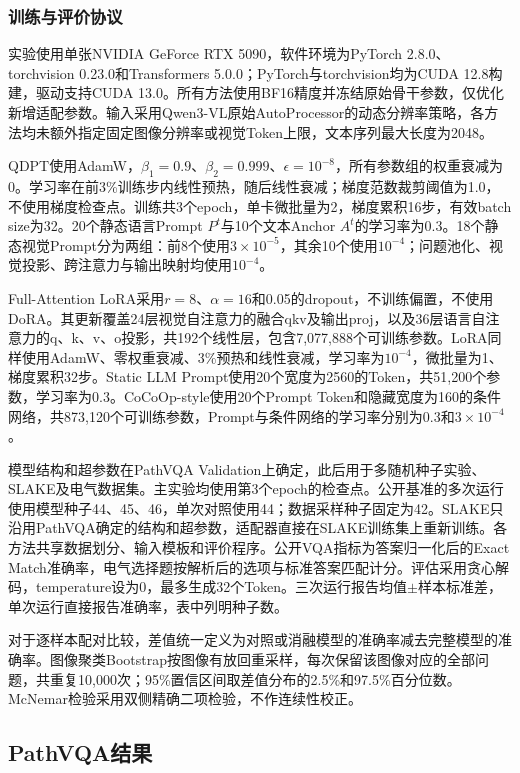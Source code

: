 \documentclass[pdflatex,sn-mathphys-num]{sn-jnl}
\begin{document}
\subsubsection{训练与评价协议}

实验使用单张NVIDIA GeForce RTX 5090，软件环境为PyTorch 2.8.0、torchvision 0.23.0和Transformers 5.0.0；PyTorch与torchvision均为CUDA 12.8构建，驱动支持CUDA 13.0。所有方法使用BF16精度并冻结原始骨干参数，仅优化新增适配参数。输入采用Qwen3-VL原始AutoProcessor的动态分辨率策略，各方法均未额外指定固定图像分辨率或视觉Token上限，文本序列最大长度为2048。

QDPT使用AdamW，$\beta_1=0.9$、$\beta_2=0.999$、$\epsilon=10^{-8}$，所有参数组的权重衰减为0。学习率在前3\%训练步内线性预热，随后线性衰减；梯度范数裁剪阈值为1.0，不使用梯度检查点。训练共3个epoch，单卡微批量为2，梯度累积16步，有效batch size为32。20个静态语言Prompt $P^t$与10个文本Anchor $A^t$的学习率为0.3。18个静态视觉Prompt分为两组：前8个使用$3\times10^{-5}$，其余10个使用$10^{-4}$；问题池化、视觉投影、跨注意力与输出映射均使用$10^{-4}$。

Full-Attention LoRA采用$r=8$、$\alpha=16$和0.05的dropout，不训练偏置，不使用DoRA。其更新覆盖24层视觉自注意力的融合qkv及输出proj，以及36层语言自注意力的q、k、v、o投影，共192个线性层，包含7,077,888个可训练参数。LoRA同样使用AdamW、零权重衰减、3\%预热和线性衰减，学习率为$10^{-4}$，微批量为1、梯度累积32步。Static LLM Prompt使用20个宽度为2560的Token，共51,200个参数，学习率为0.3。CoCoOp-style使用20个Prompt Token和隐藏宽度为160的条件网络，共873,120个可训练参数，Prompt与条件网络的学习率分别为0.3和$3\times10^{-4}$。

模型结构和超参数在PathVQA Validation上确定，此后用于多随机种子实验、SLAKE及电气数据集。主实验均使用第3个epoch的检查点。公开基准的多次运行使用模型种子44、45、46，单次对照使用44；数据采样种子固定为42。SLAKE只沿用PathVQA确定的结构和超参数，适配器直接在SLAKE训练集上重新训练。各方法共享数据划分、输入模板和评价程序。公开VQA指标为答案归一化后的Exact Match准确率，电气选择题按解析后的选项与标准答案匹配计分。评估采用贪心解码，temperature设为0，最多生成32个Token。三次运行报告均值$\pm$样本标准差，单次运行直接报告准确率，表中列明种子数。

对于逐样本配对比较，差值统一定义为对照或消融模型的准确率减去完整模型的准确率。图像聚类Bootstrap按图像有放回重采样，每次保留该图像对应的全部问题，共重复10,000次；95\%置信区间取差值分布的2.5\%和97.5\%百分位数。McNemar检验采用双侧精确二项检验，不作连续性校正。

\subsection{PathVQA结果}
\end{document}
